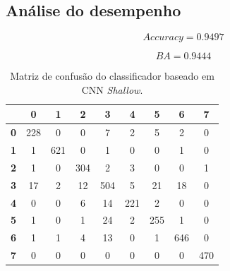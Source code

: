 \subsection{Análise do desempenho}

\begin{equation}\label{eq:cnn_deep_accuracy}
	Accuracy = 0.9497
\end{equation}

\begin{equation}\label{eq:cnn_deep_ba}
	BA = 0.9444
\end{equation}

\begin{table}[H]
	\centering
	\begin{tabular}{c||c|c|c|c|c|c|c|c|}
		\cline{2-9}
		& \textbf{0} & \textbf{1} & \textbf{2} & \textbf{3} & \textbf{4} & \textbf{5} & \textbf{6} & \textbf{7} \\ \hline \hline
		\multicolumn{1}{|c||}{\textbf{0}} & 228        & 0          & 0          & 7          & 2          & 5          & 2          & 0          \\ \hline
		\multicolumn{1}{|c||}{\textbf{1}} & 1          & 621        & 0          & 1          & 0          & 0          & 1          & 0          \\ \hline
		\multicolumn{1}{|c||}{\textbf{2}} & 1          & 0          & 304        & 2          & 3          & 0          & 0          & 1          \\ \hline
		\multicolumn{1}{|c||}{\textbf{3}} & 17         & 2          & 12         & 504        & 5          & 21         & 18         & 0          \\ \hline
		\multicolumn{1}{|c||}{\textbf{4}} & 0          & 0          & 6          & 14         & 221        & 2          & 0          & 0          \\ \hline
		\multicolumn{1}{|c||}{\textbf{5}} & 1          & 0          & 1          & 24         & 2          & 255        & 1          & 0          \\ \hline
		\multicolumn{1}{|c||}{\textbf{6}} & 1          & 1          & 4          & 13         & 0          & 1          & 646        & 0          \\ \hline
		\multicolumn{1}{|c||}{\textbf{7}} & 0          & 0          & 0          & 0          & 0          & 0          & 0          & 470        \\ \hline
	\end{tabular}
	\caption{Matriz de confusão do classificador baseado em CNN \textit{Shallow}.}
	\label{tab:mc_CNN_deep}
\end{table}

